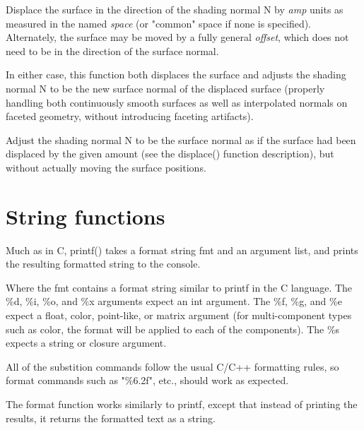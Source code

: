 \documentclass[11pt,letterpaper]{book}
\def\color{{\cf color}\xspace}
\def\float{{\cf float}\xspace}
\def\matrix{{\cf matrix}\xspace}
\def\N{{\cf N}\xspace}
\def\commonspace{{\cf "common"} space\xspace}
\begin{document}
Displace the surface in the direction of the shading normal \N by
\emph{amp} units as measured in the named \emph{space} (or \commonspace
if none is specified).  Alternately, the surface may be moved by a fully
general \emph{offset}, which does not need to be in the direction of the
surface normal.

In either case, this function both displaces the surface and adjusts the
shading normal \N to be the new surface normal of the displaced surface
(properly handling both continuously smooth surfaces as well as
interpolated normals on faceted geometry, without introducing faceting
artifacts).
\apiend


Adjust the shading normal \N to be the surface normal as if the
surface had been displaced by the given amount (see the {\cf displace()}
function description), but without actually moving the surface
positions.
\apiend


\section{String functions}
\label{sec:stdlib:string}


Much as in C, {\cf printf()} takes a format string {\cf fmt} and an
argument list, and prints the resulting formatted string to the console.

Where the {\cf fmt} contains a format string similar to {\cf printf} in
the C language. The {\cf \%d}, {\cf \%i}, {\cf \%o}, and {\cf \%x}
arguments expect an {\cf int} argument.  The {\cf \%f}, {\cf \%g}, and
{\cf \%e} expect a \float, \color, point-like, or \matrix argument (for
multi-component types such as \color, the format will be applied to each
of the components).  The {\cf \%s} expects a {\cf string} or 
{\cf closure} argument.

All of the substition commands follow the usual C/C++ formatting rules,
so format commands such as {\cf "\%6.2f"}, etc., should work as
expected.
\apiend

The {\cf format} function works similarly to {\cf printf}, except that
instead of printing the results, it returns the formatted text as a
{\cf string}.
\apiend
\end{document}
